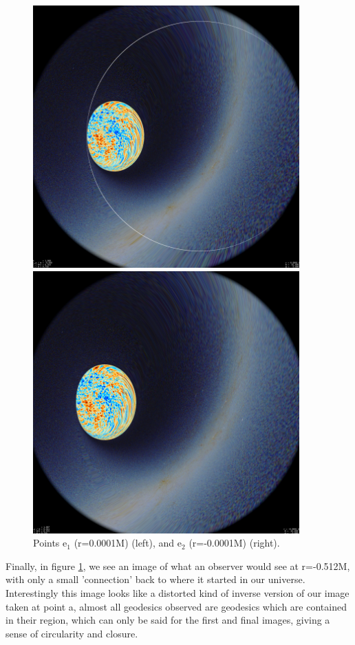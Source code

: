\documentclass[oneside,openright,frontopenright, singlespacing]{dmathesis}
\begin{document}
\vspace{1em}
\begin{figure}[!ht]
	\centering
	\begin{minipage}{0.5\textwidth}
		\centering
		\includegraphics[width=0.75\linewidth]{img/plunging5-1}
	\end{minipage}%
	\hfill
	\begin{minipage}{0.5\textwidth}
		\centering
		\includegraphics[width=0.75\linewidth]{img/plunging5-2}
	\end{minipage}
	\caption{Points e$_1$ (r=0.0001M) (left), and e$_2$ (r=-0.0001M) (right).}
	\label{fig:Figure6.6}
\end{figure}

\vspace{1em}
	Finally, in figure \ref{fig:Figure6.6}, we see an image of what an observer would see at r=-0.512M, with only a small 'connection' back to where it started in our universe. Interestingly this image looks like a distorted kind of inverse version of our image taken at point a, almost all geodesics observed are geodesics which are contained in their region, which can only be said for the first and final images, giving a sense of circularity and closure.
\end{document}
